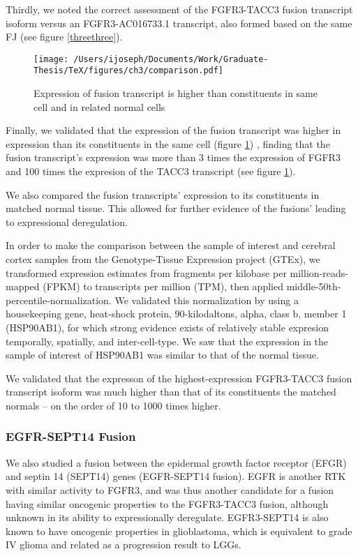 Thirdly, we noted the correct assessment of the FGFR3-TACC3 fusion transcript isoform versus an FGFR3-AC016733.1 transcript, also formed based on the same FJ (see figure \ref{threethree}).


\begin{figure}
  \centering \texttt{[image: /Users/ijoseph/Documents/Work/Graduate-Thesis/TeX/figures/ch3/comparison.pdf]}
  \caption{Expression of fusion transcript is higher than constituents in same cell and in related normal cells}\label{threefour}
\end{figure}


Finally, we validated that the expression of the fusion transcript was higher in expression than its constituents in the same cell (figure \ref{threefour}) , finding that the fusion transcript's expression was more than 3 times the expression of FGFR3 and 100 times the expresion of the TACC3 transcript (see figure \ref{threefour}).

We also compared the fusion transcripts' expression to its constituents in matched normal tissue. This allowed for further evidence of the fusions' leading to expressional deregulation.

In order to make the comparison between the sample of interest and cerebral cortex samples from the Genotype-Tissue Expression project (GTEx)\cite{lonsdale_genotype-tissue_2013}, we transformed expression estimates from fragments per kilobase per million-reads-mapped (FPKM) to transcripts per million (TPM), then applied middle-50th-percentile-normalization\cite{_what_2014}. We validated this normalization by using a housekeeping gene, heat-shock protein, 90-kilodaltons, alpha, class b, member 1 (HSP90AB1), for which strong evidence exists of relatively stable expresion temporally, spatially, and inter-cell-type. We saw that the expression in the sample of interest of HSP90AB1 was similar to that of the normal tissue.

We validated that the expresson of the highest-expression FGFR3-TACC3 fusion transcript isoform was much higher than that of its constituents the matched normals -- on the order of 10 to 1000 times higher.

\subsubsection{EGFR-SEPT14 Fusion}

We also studied a fusion between the epidermal growth factor receptor (EFGR) and septin 14 (SEPT14) genes (EGFR-SEPT14 fusion). EGFR is another RTK with similar activity to FGFR3, and was thus another candidate for a fusion having similar oncogenic properties to the FGFR3-TACC3 fusion, although unknown in its ability to expressionally deregulate. EGFR3-SEPT14 is also known to have oncogenic properties in glioblastoma, which is equivalent to grade IV glioma and related as a progression result to LGGs\cite{_omim_2016-1}. 

